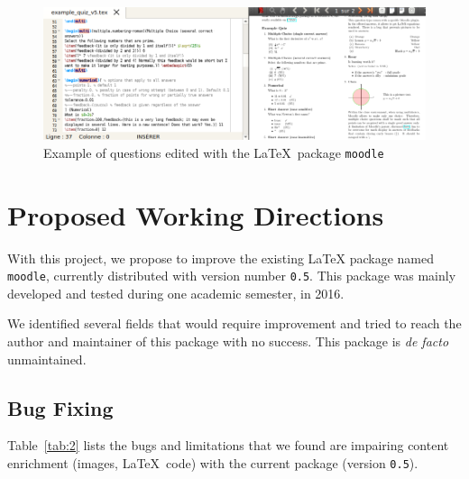\documentclass[twocolumn,a4paper,9pt]{article}
\begin{document}
\begin{figure}[tbp]
\centering
\includegraphics[width=\textwidth]{latex2moodle}
\caption{Example of questions edited with the \LaTeX\ package \texttt{moodle}}
\label{fig:latex2moodle}
\end{figure}

\section{Proposed Working Directions}

With this project, we propose to improve the existing \LaTeX{} package named 
\texttt{moodle}, currently distributed with version number \texttt{0.5}. This 
package was mainly developed and tested during one academic semester, in 2016.

We identified several fields that would require improvement and tried to reach 
the author and maintainer of this package with no success. This package is 
\emph{de facto} unmaintained.

\subsection{Bug Fixing}

Table~\ref{tab:2} lists the bugs and limitations that we found are impairing 
content enrichment (images, \LaTeX\ code) with the current package (version 
\texttt{0.5}).
\end{document}
